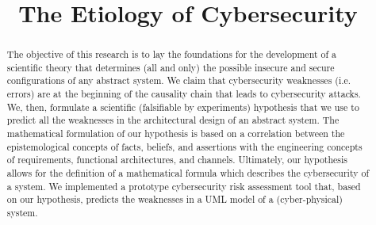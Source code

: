 \documentclass[conference]{IEEEtran}
\begin{document}
\title{The Etiology of Cybersecurity}

\author{
}

\maketitle

\begin{abstract}
	The objective of this research is to lay the foundations for the
	development of a scientific theory that determines (all and only) the
	possible insecure and secure configurations of any abstract system. We
	claim that cybersecurity weaknesses (i.e. errors) are at the beginning
	of the causality chain that leads to cybersecurity attacks.  We, then,
	formulate a scientific (falsifiable by experiments) hypothesis that we
	use to predict all the weaknesses in the architectural design of an
	abstract system. The mathematical formulation of our hypothesis is
	based on a correlation between the epistemological concepts of
	facts, beliefs, and assertions with the engineering concepts of
	requirements, functional architectures, and channels.  Ultimately, our
	hypothesis allows for the definition of a mathematical formula which
	describes the cybersecurity of a system.  We implemented a prototype
	cybersecurity risk assessment tool that, based on our hypothesis,
	predicts the weaknesses in a UML model of a (cyber-physical) system.
\end{abstract}

\IEEEpeerreviewmaketitle
\end{document}
